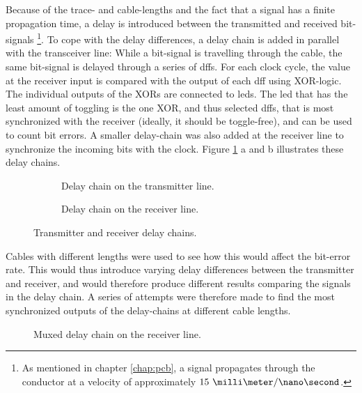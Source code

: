\documentclass[main.tex]{subfiles}
\begin{document}
Because of the trace- and cable-lengths and the fact that a signal has a finite propagation time, a delay is introduced between the transmitted and received bit-signals \footnote{As mentioned in chapter \ref{chap:pcb}, a signal propagates through the conductor at a velocity of approximately $15\ \milli\meter/\nano\second$.}. To cope with the delay differences, a delay chain is added in parallel with the transceiver line: While a bit-signal is travelling through the cable, the same bit-signal is delayed through a series of \glspl{dff}. For each clock cycle, the value at the receiver input is compared with the output of each \gls{dff} using XOR-logic. The individual outputs of the XORs are connected to \glspl{led}. The \gls{led} that has the least amount of toggling is the one XOR, and thus selected \glspl{dff}, that is most synchronized with the receiver (ideally, it should be toggle-free), and can be used to count bit errors. A smaller delay-chain was also added at the receiver line to synchronize the incoming bits with the clock. Figure \ref{fig:delaych} a and b illustrates these delay chains.

\begin{figure}
    \centering
    \begin{subfigure}{\textwidth}
        \centering
        \resizebox{1\linewidth}{!}{}
        \caption{Delay chain on the transmitter line.}
    \end{subfigure}

    \begin{subfigure}{0.6\textwidth}
        \centering
        \resizebox{1\linewidth}{!}{}
        \caption{Delay chain on the receiver line.}
    \end{subfigure}
    \caption{Transmitter and receiver delay chains.}
    \label{fig:delaych}
\end{figure}

Cables with different lengths were used to see how this would affect the bit-error rate. This would thus introduce varying delay differences between the transmitter and receiver, and would therefore produce different results comparing the signals in the delay chain. A series of attempts were therefore made to find the most synchronized outputs of the delay-chains at different cable lengths. 


\begin{figure}[!b]
    \centering
    \resizebox{0.7\linewidth}{!}{}
    \caption{Muxed delay chain on the receiver line.}
     \label{fig:rxpardelay}
\end{figure}
\end{document}
